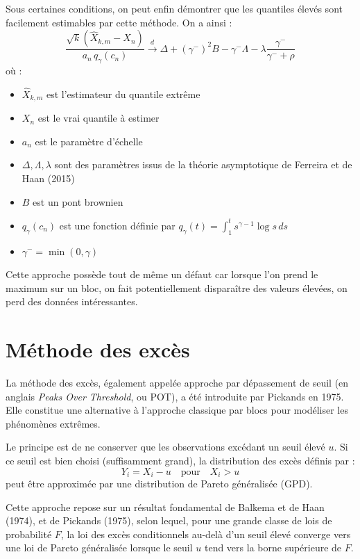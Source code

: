\documentclass{article}
\theoremstyle{plain}
\theoremstyle{definition}
\theoremstyle{plain}
\begin{document}
\noindent Sous certaines conditions, on peut enfin démontrer que les quantiles élevés sont facilement estimables par cette méthode. On a ainsi :
\[
\frac{\sqrt{k} \left( \hat{X}_{k,m} - X_n \right)}{a_n \, q_{\gamma}(c_n)}
\xrightarrow{d}
\Delta + (\gamma^-)^2 B - \gamma^- \Lambda - \lambda \frac{\gamma^-}{\gamma^- + \rho}
\]
où : \begin{itemize}
	\item $\hat{X}_{k,m}$ est l’estimateur du quantile extrême
	\item $X_n$ est le vrai quantile à estimer
	\item $a_n$ est le paramètre d'échelle
	\item $\Delta, \Lambda, \lambda$ sont des paramètres issus de la théorie asymptotique de Ferreira et de Haan (2015)
	\item $B$ est un pont brownien
	\item $q_{\gamma}(c_n)$ est une fonction définie par $q_{\gamma}(t) = \int_1^t s^{\gamma - 1} \log s \, ds$
	\item $\gamma^- = \min(0, \gamma)$
\end{itemize}
\vspace{0.5cm}
\noindent Cette approche possède tout de même un défaut car lorsque l'on prend le maximum sur un bloc, on fait potentiellement disparaître des valeurs élevées, on perd des données intéressantes.

\section{Méthode des excès}

La méthode des excès, également appelée approche par dépassement de seuil (en anglais \textit{Peaks Over Threshold}, ou POT), a été introduite par Pickands en 1975. Elle constitue une alternative à l’approche classique par blocs pour modéliser les phénomènes extrêmes.

Le principe est de ne conserver que les observations excédant un seuil élevé \( u \). Si ce seuil est bien choisi (suffisamment grand), la distribution des excès définis par :
\[
Y_i = X_i - u \quad \text{pour} \quad X_i > u
\]
peut être approximée par une distribution de Pareto généralisée (GPD).

\medskip
Cette approche repose sur un résultat fondamental de Balkema et de Haan (1974), et de Pickands (1975), selon lequel, pour une grande classe de lois de probabilité \(F\), la loi des excès conditionnels au-delà d’un seuil élevé converge vers une loi de Pareto généralisée lorsque le seuil \(u\) tend vers la borne supérieure de \(F\).
\end{document}

